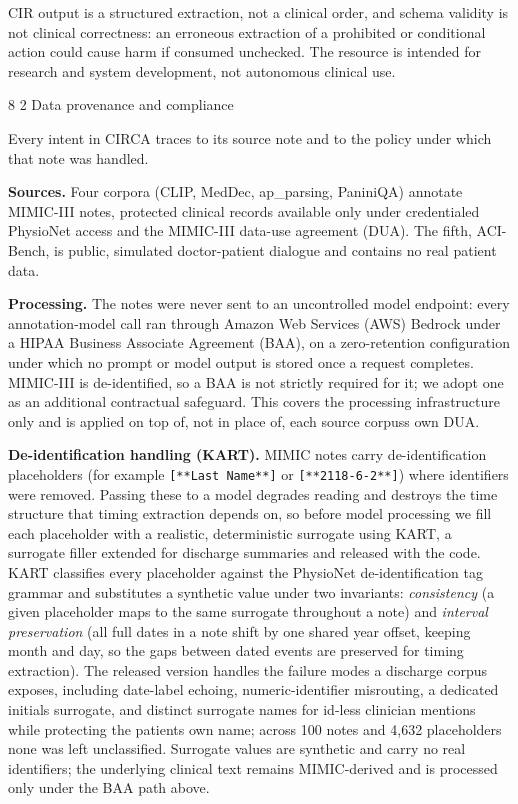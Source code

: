 \documentclass[3p,twocolumn]{elsarticle}
\makeatletter
\renewcommand\subsection{\@startsection{subsection}{2}{\z@}%
    {8\p@ \@plus 4\p@ \@minus 4\p@}%
    {2\p@ \@plus 4\p@ \@minus 3\p@}%
    {\normalfont\normalsize\itshape}}
\makeatother
\begin{document}
CIR output is a structured extraction, not a clinical order, and schema validity is not clinical correctness: an erroneous extraction of a prohibited or conditional action could cause harm if consumed unchecked. The resource is intended for research and system development, not autonomous clinical use.

\subsection{Data provenance and compliance}\label{data-provenance-and-compliance}

Every intent in CIRCA traces to its source note and to the policy under which that note was handled.

\textbf{Sources.} Four corpora (CLIP, MedDec, ap\_parsing, PaniniQA) annotate MIMIC-III notes, protected clinical records available only under credentialed PhysioNet access and the MIMIC-III data-use agreement (DUA). The fifth, ACI-Bench, is public, simulated doctor-patient dialogue and contains no real patient data.

\textbf{Processing.} The notes were never sent to an uncontrolled model endpoint: every annotation-model call ran through Amazon Web Services (AWS) Bedrock under a HIPAA Business Associate Agreement (BAA), on a zero-retention configuration under which no prompt or model output is stored once a request completes. MIMIC-III is de-identified, so a BAA is not strictly required for it; we adopt one as an additional contractual safeguard. This covers the processing infrastructure only and is applied on top of, not in place of, each source corpus\textquotesingle s own DUA.

\textbf{De-identification handling (KART).} MIMIC notes carry de-identification placeholders (for example \texttt{{[}**Last\ Name**{]}} or \texttt{{[}**2118-6-2**{]}}) where identifiers were removed. Passing these to a model degrades reading and destroys the time structure that timing extraction depends on, so before model processing we fill each placeholder with a realistic, deterministic surrogate using KART, a surrogate filler extended for discharge summaries and released with the code. KART classifies every placeholder against the PhysioNet de-identification tag grammar and substitutes a synthetic value under two invariants: \emph{consistency} (a given placeholder maps to the same surrogate throughout a note) and \emph{interval preservation} (all full dates in a note shift by one shared year offset, keeping month and day, so the gaps between dated events are preserved for timing extraction). The released version handles the failure modes a discharge corpus exposes, including date-label echoing, numeric-identifier misrouting, a dedicated initials surrogate, and distinct surrogate names for id-less clinician mentions while protecting the patient\textquotesingle s own name; across 100 notes and 4,632 placeholders none was left unclassified. Surrogate values are synthetic and carry no real identifiers; the underlying clinical text remains MIMIC-derived and is processed only under the BAA path above.
\end{document}
